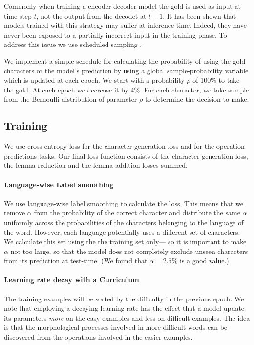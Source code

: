 \documentclass[11pt,a4paper]{article}
\begin{document}
Commonly when training a encoder-decoder model the gold is used as input at
time-step $t$, not the output from the decodet at $t-1$.
It has been shown that models trained with this strategy may suffer
at inference time. Indeed, they have never been exposed to a partially
incorrect input in the training phase.  To address this issue we use
scheduled sampling \cite{DBLP:conf/nips/BengioVJS15}.

We implement a simple schedule for calculating the probability of
using the gold characters or the model's prediction by using a global
sample-probability variable which is updated at each epoch. We start
with a probability \(\rho\) of 100\% to take the gold. At each epoch
we decrease it by 4\%. For each character, we take sample from the
Bernoulli distribution of parameter \(\rho\) to determine the
decision to make.

\subsection{Training}

We use cross-entropy loss for the character generation loss and 
for the operation predictions tasks. Our final loss function consists
of the character generation loss, the lemma-reduction and the
lemma-addition losses summed.

\paragraph{Language-wise Label smoothing} We use language-wise label
smoothing to calculate the loss. This means that we remove $\alpha$
from the probability of the correct character and distribute the same
$\alpha$ uniformly across the probabilities of the characters
belonging to the language of the word. However, each language
potentially uses a different set of characters. We calculate this set
using the the training set only--- so it is important to make $\alpha$
not too large, so that the model does not completely exclude unseen
characters from its prediction at test-time. (We found that
\(\alpha=2.5\%\) is a good value.)

\paragraph{Learning rate decay with a Curriculum} The training
examples will be sorted by the difficulty in the previous epoch.  We
note that employing a decaying learning rate has the effect that a
model update its parameters \textit{more} on the easy examples and
less on difficult examples. The idea is that the morphological
processes involved in more difficult words can be discovered from the
operations involved in the easier examples.
\end{document}
